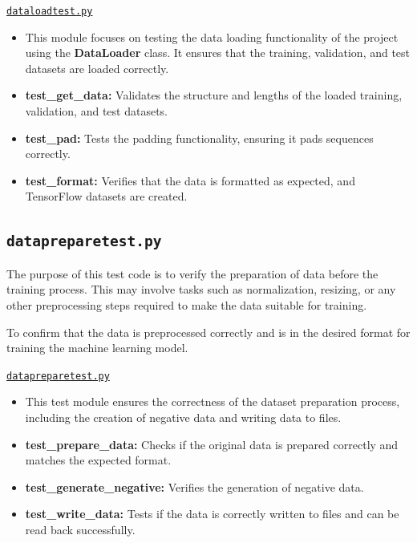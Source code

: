			\href{../Documents/MagicWand/ML23-06-Magic-Wand-with-an-Arduino-Nano-33-BLE-sense/Sourcecode/Code/Datatraining/Tests/dataloadtest.py}{\texttt{dataloadtest.py}}
			
			\begin{itemize}
				
				\item This module focuses on testing the data loading functionality of the project using the \textbf{DataLoader} class. It ensures that the training, validation, and test datasets are loaded correctly.
				
				\item \textbf{test\_get\_data:} Validates the structure and lengths of the loaded training, validation, and test datasets.
				
				\item \textbf{test\_pad:} Tests the padding functionality, ensuring it pads sequences correctly.
				
				\item \textbf{test\_format:} Verifies that the data is formatted as expected, and TensorFlow datasets are created.
				
			\end{itemize}
		
			\subsection{\texttt{datapreparetest.py}}
			
			The purpose of this test code is to verify the preparation of data before the training process. This may involve tasks such as normalization, resizing, or any other preprocessing steps required to make the data suitable for training.
			
			To confirm that the data is preprocessed correctly and is in the desired format for training the machine learning model.
			
			\href{../Documents/MagicWand/ML23-06-Magic-Wand-with-an-Arduino-Nano-33-BLE-sense/Sourcecode/Code/Datatraining/Tests/datapreparetest.py}{\texttt{datapreparetest.py}}
			
			\begin{itemize}
				
				\item This test module ensures the correctness of the dataset preparation process, including the creation of negative data and writing data to files.
				
				\item \textbf{test\_prepare\_data:} Checks if the original data is prepared correctly and matches the expected format.
				
				\item \textbf{test\_generate\_negative:} Verifies the generation of negative data.
				
				\item \textbf{test\_write\_data:} Tests if the data is correctly written to files and can be read back successfully.
				
			\end{itemize}
			
